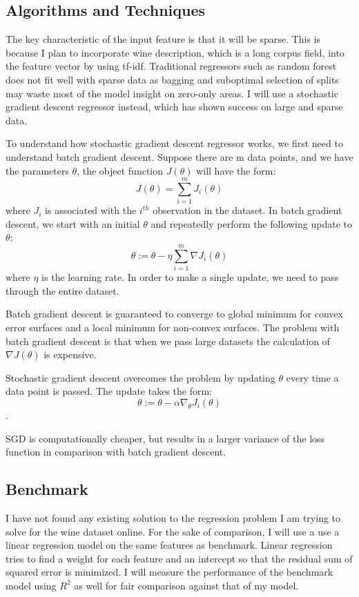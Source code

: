 \documentclass{article}
\begin{document}
\subsection{Algorithms and Techniques}
The key characteristic of the input feature is that it will be sparse. This is because I plan to incorporate wine description, which is a long corpus field, into the feature vector by using tf-idf. Traditional regressors such as random forest does not fit well with sparse data as bagging and suboptimal selection of splits may waste most of the model insight on zero-only areas. I will use a stochastic gradient descent regressor instead, which has shown success on large and sparse data\cite{sklearn_sgd}.

To understand how stochastic gradient descent regressor works, we first need to understand batch gradient descent. Suppose there are m data points, and we have the parameters $\theta$, the object function $J(\theta)$ will have the form:
$$ J(\theta)  = \sum_{i=1}^{m} J_{i}(\theta) $$
where $J_{i}$ is associated with the $i^{th}$ observation in the dataset. In batch gradient descent, we start with an initial $\theta$ and repeatedly perform the following update to $\theta$:
$$\theta := \theta-\eta \sum_{i=1}^{m}\nabla J_{i}(\theta)$$
where $\eta$ is the learning rate. In order to make a single update, we need to pass through the entire dataset.

Batch gradient descent is guaranteed to converge to global minimum for convex error surfaces and a local minimum for non-convex surfaces. The problem with batch gradient descent is that when we pass large datasets the calculation of $\nabla J(\theta)$ is expensive. 

Stochastic gradient descent overcomes the problem by updating $\theta$ every time a data point is passed. The update takes the form:
$$ \theta := \theta - \alpha \nabla_{\theta} J_{i}(\theta) $$.

SGD is computationally cheaper, but results in a larger variance of the loss function in comparison with batch gradient descent.

\subsection{Benchmark}
I have not found any existing solution to the regression problem I am trying to solve for the wine dataset online. For the sake of comparison, I will use a use a linear regression model on the same features as benchmark. Linear regression tries to find a weight for each feature and an intercept so that the residual sum of squared error is minimized. I will measure the performance of the benchmark model using $R^2$ as well for fair comparison against that of my model.
\end{document}
